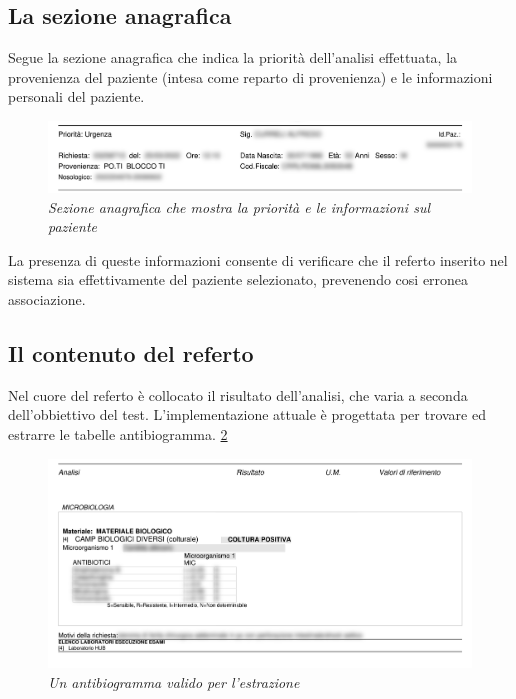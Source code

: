 \subsection{La sezione anagrafica}
Segue la sezione anagrafica che indica la priorità dell'analisi effettuata, la provenienza del paziente (intesa come reparto di provenienza) e le informazioni personali del paziente.
\begin{figure}[h!]
	\centering
	\includegraphics[width=.99\columnwidth]{images/sezione_anagrafica.png}
	\caption{\textit{Sezione anagrafica che mostra la priorità e le informazioni sul paziente}}
	\label{fig:header}
\end{figure}
\bigskip
\newline
La presenza di queste informazioni consente di verificare che il referto inserito nel sistema sia effettivamente del paziente selezionato, prevenendo cosi erronea associazione.

\newpage
\subsection{Il contenuto del referto}
Nel cuore del referto è collocato il risultato dell'analisi, che varia a seconda dell'obbiettivo del test. L'implementazione attuale è progettata per trovare ed estrarre le tabelle antibiogramma. \ref{fig:content}
\begin{figure}[h!]
	\centering
	\includegraphics[width=.99\columnwidth]{images/content.png}
	\caption{\textit{Un antibiogramma valido per l'estrazione}}
	\label{fig:content}
\end{figure}
\bigskip

